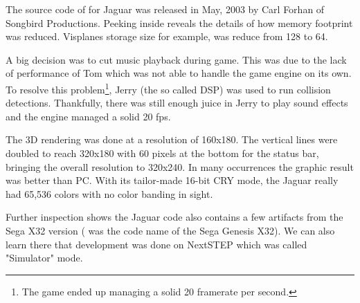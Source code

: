 The source code of \doom{} for Jaguar was released in May, 2003 by Carl Forhan of Songbird Productions. Peeking inside reveals the details of how memory footprint was reduced. Visplanes storage size for example, was reduce from 128 to 64.\\
\par
{}
\par
A big decision was to cut music playback during game. This was due to the lack of performance of Tom which was not able to handle the game engine on its own. To resolve this problem\footnote{The game ended up managing a solid 20 framerate per second.}, Jerry (the so called DSP) was used to run collision detections. Thankfully, there was still enough juice in Jerry to play sound effects and the engine managed a solid 20 fps.\\
\par
The 3D rendering was done at a resolution of 160x180. The vertical lines were doubled to reach 320x180 with 60 pixels at the bottom for the status bar, bringing the overall resolution to 320x240. In many occurrences the graphic result was better than PC. With its tailor-made 16-bit CRY mode, the Jaguar really had 65,536 colors with no color banding in sight.




\par
Further inspection shows the Jaguar code also contains a few artifacts from the Sega X32 version ( was the code name of the Sega Genesis X32). We can also learn there that development was done on NextSTEP which was called "Simulator" mode.\\
\par
{}
\par


